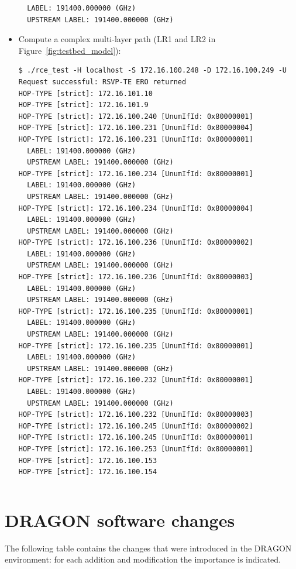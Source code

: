 \documentclass[10pt,a4paper]{report}
\begin{document}
\begin{itemize}
{{\begin{verbatim}
  LABEL: 191400.000000 (GHz)
  UPSTREAM LABEL: 191400.000000 (GHz)
\end{verbatim}
}}
\newpage
\item{Compute a complex multi-layer path (LR1 and LR2 in
    Figure~\ref{fig:testbed_model}): {\small
\begin{verbatim}
$ ./rce_test -H localhost -S 172.16.100.248 -D 172.16.100.249 -U
Request successful: RSVP-TE ERO returned
HOP-TYPE [strict]: 172.16.101.10
HOP-TYPE [strict]: 172.16.101.9
HOP-TYPE [strict]: 172.16.100.240 [UnumIfId: 0x80000001]
HOP-TYPE [strict]: 172.16.100.231 [UnumIfId: 0x80000004]
HOP-TYPE [strict]: 172.16.100.231 [UnumIfId: 0x80000001]
  LABEL: 191400.000000 (GHz)
  UPSTREAM LABEL: 191400.000000 (GHz)
HOP-TYPE [strict]: 172.16.100.234 [UnumIfId: 0x80000001]
  LABEL: 191400.000000 (GHz)
  UPSTREAM LABEL: 191400.000000 (GHz)
HOP-TYPE [strict]: 172.16.100.234 [UnumIfId: 0x80000004]
  LABEL: 191400.000000 (GHz)
  UPSTREAM LABEL: 191400.000000 (GHz)
HOP-TYPE [strict]: 172.16.100.236 [UnumIfId: 0x80000002]
  LABEL: 191400.000000 (GHz)
  UPSTREAM LABEL: 191400.000000 (GHz)
HOP-TYPE [strict]: 172.16.100.236 [UnumIfId: 0x80000003]
  LABEL: 191400.000000 (GHz)
  UPSTREAM LABEL: 191400.000000 (GHz)
HOP-TYPE [strict]: 172.16.100.235 [UnumIfId: 0x80000001]
  LABEL: 191400.000000 (GHz)
  UPSTREAM LABEL: 191400.000000 (GHz)
HOP-TYPE [strict]: 172.16.100.235 [UnumIfId: 0x80000001]
  LABEL: 191400.000000 (GHz)
  UPSTREAM LABEL: 191400.000000 (GHz)
HOP-TYPE [strict]: 172.16.100.232 [UnumIfId: 0x80000001]
  LABEL: 191400.000000 (GHz)
  UPSTREAM LABEL: 191400.000000 (GHz)
HOP-TYPE [strict]: 172.16.100.232 [UnumIfId: 0x80000003]
HOP-TYPE [strict]: 172.16.100.245 [UnumIfId: 0x80000002]
HOP-TYPE [strict]: 172.16.100.245 [UnumIfId: 0x80000001]
HOP-TYPE [strict]: 172.16.100.253 [UnumIfId: 0x80000001]
HOP-TYPE [strict]: 172.16.100.153
HOP-TYPE [strict]: 172.16.100.154
\end{verbatim}
}}
\end{itemize}

{\small
\begin{verbatim}
\end{verbatim}
}

\clearpage
\mbox{}
\clearpage

\chapter{DRAGON software changes}
The following table contains the changes that were introduced in the
DRAGON environment: for each addition and modification the importance
is indicated.
\end{document}
